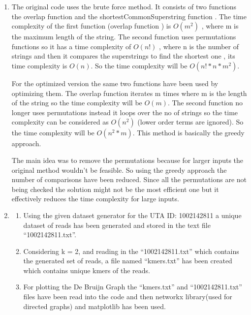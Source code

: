 \documentclass[11pt, oneside]{article}   	%
\begin{document}
\pagestyle{fancy}
\fancyhead{}

\begin{enumerate}
\item 

The original code uses the brute force method. It consists of two functions the overlap function and the  shortestCommonSuperstring function . The time complexity of the first function (overlap function ) is  $O(m^2)$ , where m is the maximum length of the string. The second function uses permutations functions so it has a time complexity of $O(n!)$ , where n is the number of strings and then it compares the superstrings to find the shortest one , its time complexity is $O(n)$. So the time complexity will be $O(n!*n*m^2)$.
\par
For the optimized version the same two functions have been used by optimizing them. The overlap function iterates m times where m is the length of the string so the time complexity will be $O(m)$. The second function no longer uses permutations instead it loops over the no of strings so the time complexity can be considered as $O(n^2)$ (lower order terms are ignored). So the time complexity will be $O(n^2 * m)$. This method is basically the greedy approach.
\par
The main idea was to remove the permutations because for larger inputs the original method wouldn’t be feasible. So using the greedy approach the number of comparisons have been reduced. Since all the permutations are not being checked the solution might not be the most efficient one but it effectively reduces the time complexity for large inputs. 
\\
\item 

\begin{enumerate}[label={2.\arabic*}]
  \item
 Using the given dataset generator for the UTA ID: 1002142811 a unique dataset of reads has been generated and stored in the text file “1002142811.txt”.
  \item
Considering k = 2, and reading in the “1002142811.txt” which contains the generated set of reads, a file named “kmers.txt” has been created which contains unique kmers of the reads.
  \item
For plotting the De Bruijn Graph the “kmers.txt” and “1002142811.txt” files have been read into the code and then networkx library(used for directed graphs) and matplotlib has been used.
\addtocounter{enumi}{1} %


\end{enumerate}
\end{enumerate}
\end{document}
